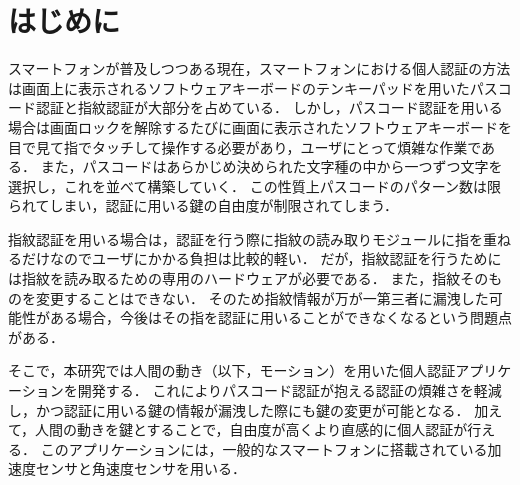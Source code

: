 \section{はじめに}
スマートフォンが普及しつつある現在，スマートフォンにおける個人認証の方法は画面上に表示されるソフトウェアキーボードのテンキーパッドを用いたパスコード認証と指紋認証が大部分を占めている．
しかし，パスコード認証を用いる場合は画面ロックを解除するたびに画面に表示されたソフトウェアキーボードを目で見て指でタッチして操作する必要があり，ユーザにとって煩雑な作業である．
また，パスコードはあらかじめ決められた文字種の中から一つずつ文字を選択し，これを並べて構築していく．
この性質上パスコードのパターン数は限られてしまい，認証に用いる鍵の自由度が制限されてしまう．

指紋認証を用いる場合は，認証を行う際に指紋の読み取りモジュールに指を重ねるだけなのでユーザにかかる負担は比較的軽い．
だが，指紋認証を行うためには指紋を読み取るための専用のハードウェアが必要である．
また，指紋そのものを変更することはできない．
そのため指紋情報が万が一第三者に漏洩した可能性がある場合，今後はその指を認証に用いることができなくなるという問題点がある．

そこで，本研究では人間の動き（以下，モーション）を用いた個人認証アプリケーションを開発する．
これによりパスコード認証が抱える認証の煩雑さを軽減し，かつ認証に用いる鍵の情報が漏洩した際にも鍵の変更が可能となる．
加えて，人間の動きを鍵とすることで，自由度が高くより直感的に個人認証が行える．
このアプリケーションには，一般的なスマートフォンに搭載されている加速度センサと角速度センサを用いる．
